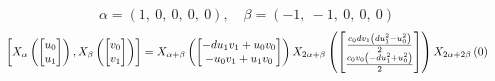 \documentclass[11pt]{article}
\theoremstyle{definition}
\begin{document}
\[
\alpha = \left( 1, \  0, \  0, \  0, \  0\right), \quad \beta = \left( -1, \  -1, \  0, \  0, \  0\right)
\]
\[
\scaletoalign{\textwidth}{\left[ X_{\alpha}\left(\left[\begin{matrix}u_{0}\\u_{1}\end{matrix}\right]\right), X_{\beta}\left(\left[\begin{matrix}v_{0}\\v_{1}\end{matrix}\right]\right) \right] = X_{\alpha + \beta}\left(\left[\begin{matrix}- d u_{1} v_{1} + u_{0} v_{0}\\- u_{0} v_{1} + u_{1} v_{0}\end{matrix}\right]\right) X_{2\alpha + \beta}\left(\left[\begin{matrix}\frac{c_{0} d v_{1} \left(d u_{1}^{2} - u_{0}^{2}\right)}{2}\\\frac{c_{0} v_{0} \left(- d u_{1}^{2} + u_{0}^{2}\right)}{2}\end{matrix}\right]\right) X_{2\alpha + 2\beta}\left(0\right)}
\]
\end{document}
